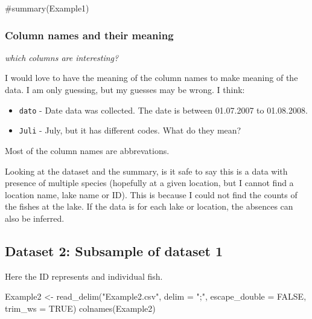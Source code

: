 \documentclass[
]{article}
\newenvironment{Shaded}{\begin{snugshade}}{\end{snugshade}}
\newcommand{\AttributeTok}[1]{\textcolor[rgb]{0.40,0.45,0.13}{#1}}
\newcommand{\CommentTok}[1]{\textcolor[rgb]{0.37,0.37,0.37}{#1}}
\newcommand{\ConstantTok}[1]{\textcolor[rgb]{0.56,0.35,0.01}{#1}}
\newcommand{\FunctionTok}[1]{\textcolor[rgb]{0.28,0.35,0.67}{#1}}
\newcommand{\NormalTok}[1]{\textcolor[rgb]{0.00,0.23,0.31}{#1}}
\newcommand{\OtherTok}[1]{\textcolor[rgb]{0.00,0.23,0.31}{#1}}
\newcommand{\StringTok}[1]{\textcolor[rgb]{0.13,0.47,0.30}{#1}}
\begin{document}
\begin{Shaded}
\begin{Highlighting}[]
\CommentTok{\#summary(Example1)}
\end{Highlighting}
\end{Shaded}

\hypertarget{column-names-and-their-meaning}{%
\subsubsection{Column names and their
meaning}\label{column-names-and-their-meaning}}

\emph{which columns are interesting?}

I would love to have the meaning of the column names to make meaning of
the data. I am only guessing, but my guesses may be wrong. I think:

\begin{itemize}
\item
  \texttt{dato} - Date data was collected. The date is between
  01.07.2007 to 01.08.2008.
\item
  \texttt{Juli} - July, but it has different codes. What do they mean?
\end{itemize}

Most of the column names are abbrevations.

Looking at the dataset and the summary, is it safe to say this is a data
with presence of multiple species (hopefully at a given location, but I
cannot find a location name, lake name or ID). This is because I could
not find the counts of the fishes at the lake. If the data is for each
lake or location, the absences can also be inferred.

\hypertarget{dataset-2-subsample-of-dataset-1}{%
\subsection{Dataset 2: Subsample of dataset
1}\label{dataset-2-subsample-of-dataset-1}}

Here the ID represents and individual fish.

\begin{Shaded}
\begin{Highlighting}[]
\NormalTok{Example2 }\OtherTok{\textless{}{-}} \FunctionTok{read\_delim}\NormalTok{(}\StringTok{"Example2.csv"}\NormalTok{, }\AttributeTok{delim =} \StringTok{";"}\NormalTok{, }
    \AttributeTok{escape\_double =} \ConstantTok{FALSE}\NormalTok{, }\AttributeTok{trim\_ws =} \ConstantTok{TRUE}\NormalTok{)}
\FunctionTok{colnames}\NormalTok{(Example2)}
\end{Highlighting}
\end{Shaded}
\end{document}
